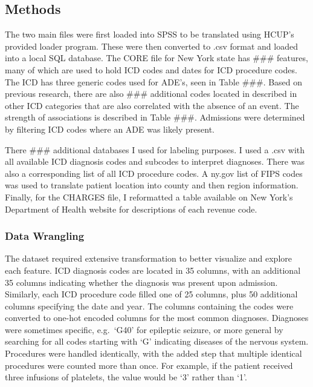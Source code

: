 \documentclass[preprint, 3p,
authoryear]{elsarticle} %
\begin{document}
\hypertarget{methods}{%
\subsection{Methods}\label{methods}}

The two main files were first loaded into SPSS to be translated using
HCUP's provided loader program. These were then converted to .csv format
and loaded into a local SQL database. The CORE file for New York state
has \#\#\# features, many of which are used to hold ICD codes and dates
for ICD procedure codes. The ICD has three generic codes used for ADE's,
seen in Table \#\#\#. Based on previous research, there are also \#\#\#
additional codes located in described in other ICD categories that are
also correlated with the absence of an event. The strength of
associations is described in Table \#\#\#. Admissions were determined by
filtering ICD codes where an ADE was likely present.

There \#\#\# additional databases I used for labeling purposes. I used a
.csv with all available ICD diagnosis codes and subcodes to interpret
diagnoses. There was also a corresponding list of all ICD procedure
codes. A ny.gov list of FIPS codes was used to translate patient
location into county and then region information. Finally, for the
CHARGES file, I reformatted a table available on New York's Department
of Health website for descriptions of each revenue code.

\hypertarget{data-wrangling}{%
\subsubsection{Data Wrangling}\label{data-wrangling}}

The dataset required extensive transformation to better visualize and
explore each feature. ICD diagnosis codes are located in 35 columns,
with an additional 35 columns indicating whether the diagnosis was
present upon admission. Similarly, each ICD procedure code filled one of
25 columns, plus 50 additional columns specifying the date and year. The
columns containing the codes were converted to one-hot encoded columns
for the most common diagnoses. Diagnoses were sometimes specific,
e.g.~`G40' for epileptic seizure, or more general by searching for all
codes starting with `G' indicating diseases of the nervous system.
Procedures were handled identically, with the added step that multiple
identical procedures were counted more than once. For example, if the
patient received three infusions of platelets, the value would be `3'
rather than `1'.
\end{document}
